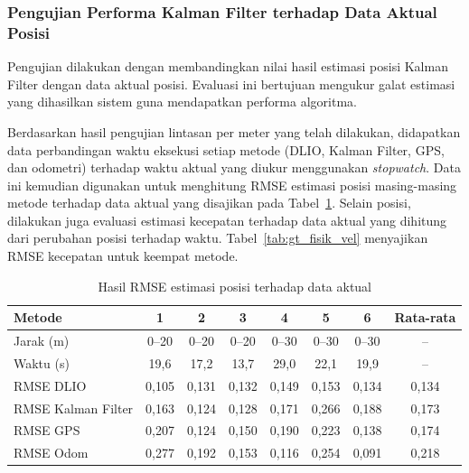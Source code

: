 \subsubsection{Pengujian Performa Kalman Filter terhadap Data Aktual Posisi}
\label{sec:validasi_gt}

Pengujian dilakukan dengan membandingkan nilai hasil estimasi posisi Kalman Filter dengan data aktual posisi.
Evaluasi ini bertujuan mengukur galat estimasi yang dihasilkan sistem guna mendapatkan performa algoritma.
%
%

Berdasarkan hasil pengujian lintasan per meter yang telah dilakukan, didapatkan data perbandingan waktu eksekusi setiap metode (DLIO, Kalman Filter, GPS, dan odometri) terhadap waktu aktual yang diukur menggunakan \emph{stopwatch}.
Data ini kemudian digunakan untuk menghitung RMSE estimasi posisi masing-masing metode terhadap data aktual yang disajikan pada Tabel~\ref{tab:gt_fisik}.
Selain posisi, dilakukan juga evaluasi estimasi kecepatan terhadap data aktual yang dihitung dari perubahan posisi terhadap waktu.
Tabel~\ref{tab:gt_fisik_vel} menyajikan RMSE kecepatan untuk keempat metode.

\begin{table}[H]
\centering
\footnotesize
\caption{Hasil RMSE estimasi posisi terhadap data aktual}
\label{tab:gt_fisik}
\begin{tabular}{l c c c c c c c}
\hline
\textbf{Metode} & \textbf{1} & \textbf{2} & \textbf{3} & \textbf{4} & \textbf{5} & \textbf{6} & \textbf{Rata-rata} \\
\hline
Jarak (m)  & 0--20 & 0--20 & 0--20 & 0--30 & 0--30 & 0--30 & -- \\
Waktu (s)  & 19,6 & 17,2 & 13,7 & 29,0 & 22,1 & 19,9 & -- \\
\hline
RMSE DLIO  & 0,105 & 0,131 & 0,132 & 0,149 & 0,153 & 0,134 & 0,134 \\
RMSE Kalman Filter    & 0,163 & 0,124 & 0,128 & 0,171 & 0,266 & 0,188 & 0,173 \\
RMSE GPS   & 0,207 & 0,124 & 0,150 & 0,190 & 0,223 & 0,138 & 0,174 \\
RMSE Odom  & 0,277 & 0,192 & 0,153 & 0,116 & 0,254 & 0,091 & 0,218 \\
\hline
\end{tabular}
\end{table}

